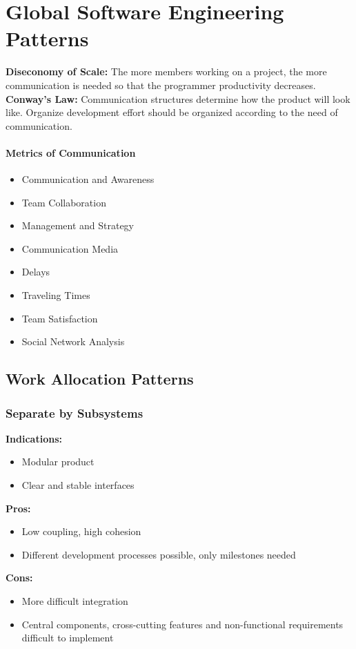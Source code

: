 
\section{Global Software Engineering Patterns}
\textbf{Diseconomy of Scale:}
The more members working on a project, the more communication is needed so that the programmer productivity decreases.\\
\textbf{Conway's Law:}
Communication structures determine how the product will look like.
Organize development effort should be organized according to the need of communication.


\paragraph{Metrics of Communication}
\begin{itemize}[topsep=5pt, itemsep=0pt]
  \item Communication and Awareness
  \item Team Collaboration
  \item Management and Strategy
  \item Communication Media
  \item Delays
  \item Traveling Times
  \item Team Satisfaction
  \item Social Network Analysis
\end{itemize}

\subsection{Work Allocation Patterns}
\subsubsection{Separate by Subsystems}
\textbf{Indications:}
\begin{itemize}[itemsep=0pt]
  \item Modular product
  \item Clear and stable interfaces
\end{itemize}
\textbf{Pros:}
\begin{itemize}[itemsep=0pt]
  \item Low coupling, high cohesion
  \item Different development processes possible, only milestones needed
\end{itemize}
\textbf{Cons:}
\begin{itemize}[itemsep=0pt]
  \item More difficult integration
  \item Central components, cross-cutting features and non-functional requirements difficult to implement
\end{itemize}

